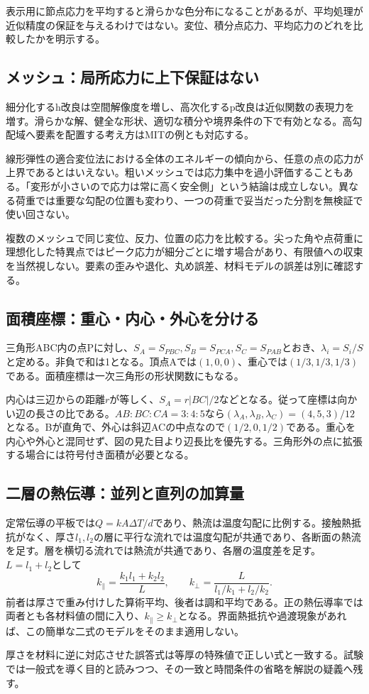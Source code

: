表示用に節点応力を平均すると滑らかな色分布になることがあるが、平均処理が近似精度の保証を与えるわけではない。変位、積分点応力、平均応力のどれを比較したかを明示する。

\subsection{メッシュ：局所応力に上下保証はない}
\label{theory:fem:mesh}
細分化するh改良は空間解像度を増し、高次化するp改良は近似関数の表現力を増す。滑らかな解、健全な形状、適切な積分や境界条件の下で有効となる。高勾配域へ要素を配置する考え方はMITの例とも対応する\parencite{mit_roy_fea1999}。

線形弾性の適合変位法における全体のエネルギーの傾向から、任意の点の応力が上界であるとはいえない。粗いメッシュでは応力集中を過小評価することもある。「変形が小さいので応力は常に高く安全側」という結論は成立しない。異なる荷重では重要な勾配の位置も変わり、一つの荷重で妥当だった分割を無検証で使い回さない。

複数のメッシュで同じ変位、反力、位置の応力を比較する。尖った角や点荷重に理想化した特異点ではピーク応力が細分ごとに増す場合があり、有限値への収束を当然視しない。要素の歪みや退化、丸め誤差、材料モデルの誤差は別に確認する。

\subsection{面積座標：重心・内心・外心を分ける}
\label{theory:fem:area}
三角形ABC内の点Pに対し、$S_A=S_{PBC},S_B=S_{PCA},S_C=S_{PAB}$とおき、$\lambda_i=S_i/S$と定める。非負で和は1となる。頂点Aでは$(1,0,0)$、重心では$(1/3,1/3,1/3)$である。面積座標は一次三角形の形状関数にもなる。

内心は三辺からの距離$r$が等しく、$S_A=r|BC|/2$などとなる。従って座標は向かい辺の長さの比である。$AB:BC:CA=3:4:5$なら$(\lambda_A,\lambda_B,\lambda_C)=(4,5,3)/12$となる。Bが直角で、外心は斜辺ACの中点なので$(1/2,0,1/2)$である。重心を内心や外心と混同せず、図の見た目より辺長比を優先する。三角形外の点に拡張する場合には符号付き面積が必要となる。

\subsection{二層の熱伝導：並列と直列の加算量}
\label{theory:fem:thermal}
定常伝導の平板では$Q=kA\Delta T/d$であり、熱流は温度勾配に比例する\parencite{openstax_thermal_conduction}。接触熱抵抗がなく、厚さ$l_1,l_2$の層に平行な流れでは温度勾配が共通であり、各断面の熱流を足す。層を横切る流れでは熱流が共通であり、各層の温度差を足す。$L=l_1+l_2$として
\[
 k_\parallel=\frac{k_1l_1+k_2l_2}{L},\qquad
 k_\perp=\frac{L}{l_1/k_1+l_2/k_2}.
\]
前者は厚さで重み付けした算術平均、後者は調和平均である。正の熱伝導率では両者とも各材料値の間に入り、$k_\parallel\ge k_\perp$となる。界面熱抵抗や過渡現象があれば、この簡単な二式のモデルをそのまま適用しない。

厚さを材料に逆に対応させた誤答式は等厚の特殊値で正しい式と一致する。試験では一般式を導く目的と読みつつ、その一致と時間条件の省略を解説の疑義へ残す。
